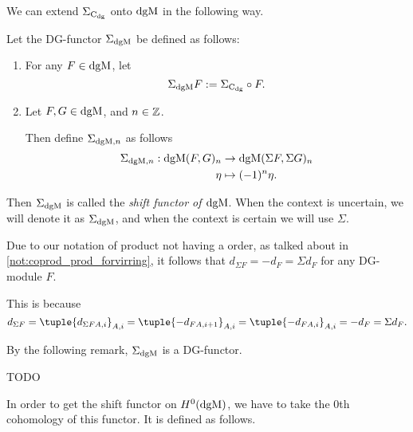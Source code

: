 We can extend \( \Sigma_{\operatorname{C}_{\operatorname{dg}}} \) onto \( \operatorname{dgM} \) in the following way.

\begin{definition}
    \label{def:sigma_dgmod}
    Let the DG-functor \( \Sigma_{\operatorname{dgM}} \) be defined as follows:
    \begin{enumerate}
        \item {
            For any \( F \in \operatorname{dgM} \), let
            \[
                \Sigma_{\operatorname{dgM}} F := \Sigma_{\operatorname{C}_{\operatorname{dg}}} \circ F.
            \]
        }
        \item {
            Let \( F, G \in \operatorname{dgM} \), and \( n \in {\mathbb{Z}} \).
            
            Then define \( \Sigma_{\operatorname{dgM}, n} \) as follows
            \begin{align*}
                \Sigma_{\operatorname{dgM}, n}: \operatorname{dgM}(F, G)_n &\to \operatorname{dgM}(\Sigma F, \Sigma G)_n \\
                \eta &\mapsto (-1)^n \eta.
            \end{align*}
        }
    \end{enumerate}
    Then \( \Sigma_{\operatorname{dgM}} \) is called the \emph{shift functor of \( \operatorname{dgM} \)}. When the context is uncertain, we will denote it as \( \Sigma_{\operatorname{dgM}} \), and when the context is certain we will use \( \Sigma \).
\end{definition}

\begin{remark}
    Due to our notation of product not having a order, as talked about in \autoref{not:coprod_prod_forvirring}, it follows that \( d_{\Sigma F} = -d_F = \Sigma d_F\) for any DG-module \( F \).

    This is because
    \[
        d_{\Sigma F} = \tuple{d_{\Sigma F A, i}}_{A, i} = \tuple{-d_{F A, i + 1}}_{A, i} = \tuple{-d_{F A, i}}_{A, i} = -d_F = \Sigma d_F.
    \]
\end{remark}

By the following remark, \( \Sigma_{\operatorname{dgM}} \) is a DG-functor.

\begin{remark}
    TODO
\end{remark}

In order to get the shift functor on \( H^0(\operatorname{dgM}) \), we have to take the \( 0 \)th cohomology of this functor. It is defined as follows.

